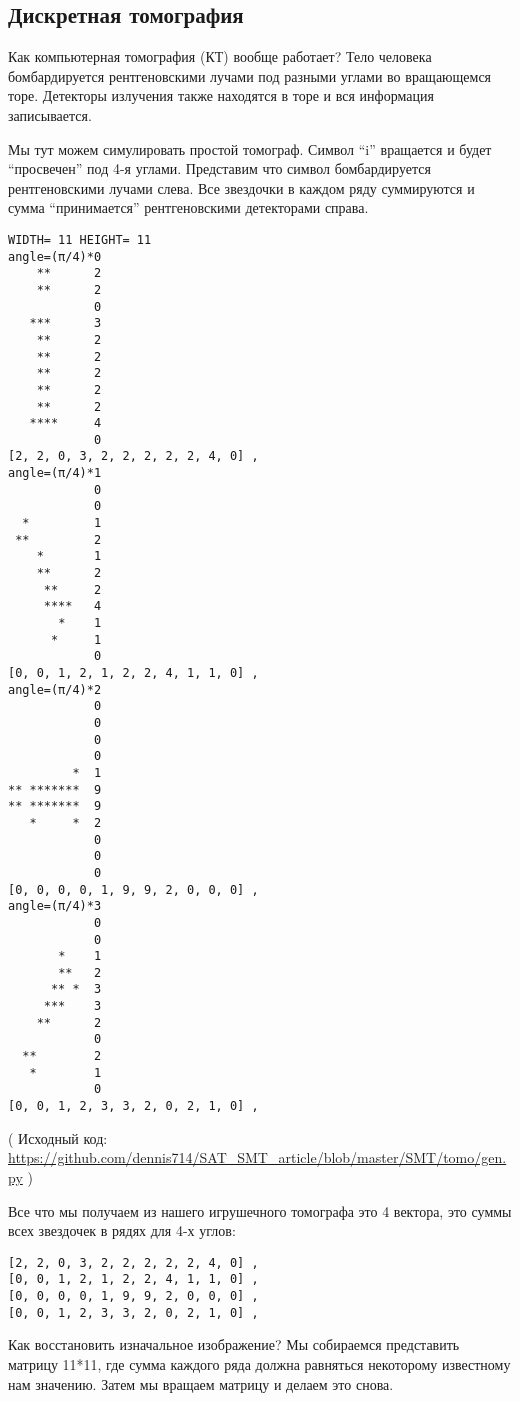 \subsection{Дискретная томография}

Как компьютерная томография (КТ) вообще работает?
Тело человека бомбардируется рентгеновскими лучами под разными углами во вращающемся торе.
Детекторы излучения также находятся в торе и вся информация записывается.

Мы тут можем симулировать простой томограф.
Символ ``i'' вращается и будет ``просвечен'' под 4-я углами.
Представим что символ бомбардируется рентгеновскими лучами слева.
Все звездочки в каждом ряду суммируются и сумма ``принимается'' рентгеновскими детекторами справа.

\begin{lstlisting}
WIDTH= 11 HEIGHT= 11
angle=(π/4)*0
    **      2
    **      2
            0
   ***      3
    **      2
    **      2
    **      2
    **      2
    **      2
   ****     4
            0
[2, 2, 0, 3, 2, 2, 2, 2, 2, 4, 0] ,
angle=(π/4)*1
            0
            0
  *         1
 **         2
    *       1
    **      2
     **     2
     ****   4
       *    1
      *     1
            0
[0, 0, 1, 2, 1, 2, 2, 4, 1, 1, 0] ,
angle=(π/4)*2
            0
            0
            0
            0
         *  1
** *******  9
** *******  9
   *     *  2
            0
            0
            0
[0, 0, 0, 0, 1, 9, 9, 2, 0, 0, 0] ,
angle=(π/4)*3
            0
            0
       *    1
       **   2
      ** *  3
     ***    3
    **      2
            0
  **        2
   *        1
            0
[0, 0, 1, 2, 3, 3, 2, 0, 2, 1, 0] ,
\end{lstlisting}

( Исходный код: \url{https://github.com/dennis714/SAT_SMT_article/blob/master/SMT/tomo/gen.py} )

Все что мы получаем из нашего игрушечного томографа это 4 вектора, это суммы всех звездочек в рядях для 4-х углов:

\begin{lstlisting}
[2, 2, 0, 3, 2, 2, 2, 2, 2, 4, 0] ,
[0, 0, 1, 2, 1, 2, 2, 4, 1, 1, 0] ,
[0, 0, 0, 0, 1, 9, 9, 2, 0, 0, 0] ,
[0, 0, 1, 2, 3, 3, 2, 0, 2, 1, 0] ,
\end{lstlisting}

Как восстановить изначальное изображение?
Мы собираемся представить матрицу 11*11, где сумма каждого ряда должна равняться некоторому известному нам значению.
Затем мы вращаем матрицу и делаем это снова.

